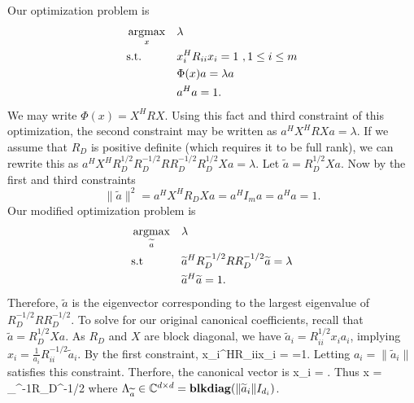 Our optimization problem is
\begin{equation*}
\begin{aligned}
&\mathop{\rm argmax}_{x}&&\lambda\\
&\text{s.t.} &&x_i^HR_{ii}x_i  = 1\,\,,1\leq i\leq m\\
&&& \Phi(x) a = \lambda a\\
&&& a^Ha=1.\\
\end{aligned}
\end{equation*}
We may write $\Phi(x) = X^H R X$. Using this fact and third constraint of this
optimization, the second constraint may be written as $a^HX^H R Xa=\lambda$. If we assume
that $R_D$ is positive definite (which requires it to be full rank), we can rewrite this
as $a^HX^HR_D^{1/2}R_D^{-1/2}RR_D^{-1/2}R_D^{1/2}Xa=\lambda$. Let
$\widetilde{a}=R_D^{1/2}Xa$. Now by the first and third constraints
\begin{equation*}
\|\tilde{a}\|^2 = a^HX^HR_DXa=a^H I_m a = a^Ha = 1.
\end{equation*}
Our modified optimization problem is
\begin{equation*}
\begin{aligned}
&\mathop{\rm argmax}_{\widetilde{a}}&&\lambda\\
&\text{s.t}&& \widetilde{a}^HR_D^{-1/2}RR_D^{-1/2}\widetilde{a} = \lambda\\
&&& \widetilde{a}^H\widetilde{a}=1.\\
\end{aligned}
\end{equation*}
Therefore, $\widetilde{a}$ is the eigenvector corresponding to the largest eigenvalue of
$R_D^{-1/2}RR_D^{-1/2}$. To solve for our original canonical coefficients, recall that
$\widetilde{a}=R_D^{1/2}Xa$. As $R_D$ and $X$ are block diagonal, we have
$\widetilde{a}_i=R_{ii}^{1/2}x_ia_i$, implying $x_i =
\frac{1}{a_i}R_{ii}^{-1/2}\widetilde{a}_i$. By the first constraint, 
\be
x_i^HR_{ii}x_i  =  =1.
\ee
Letting $a_i = \|\widetilde{a}_i\|$ satisfies this constraint. Therfore, the canonical vector is
\be
x_i = .
\ee
Thus
\be
x = \Lambda_{}^{-1}R_D^{-1/2}
\ee
where $\Lambda_{\widetilde{a}}\in\mathbb{C}^{d\times d}=\mathop{\bf blkdiag}(\|\widetilde{a}_i\|I_{d_i})$.



